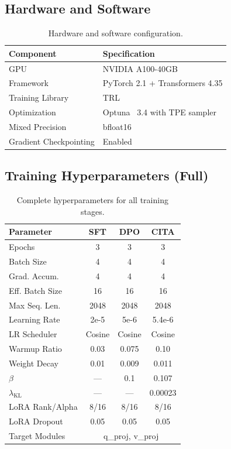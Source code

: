 \subsection{Hardware and Software}

\begin{table}[H]
\centering
\small
\begin{tabular}{@{}ll@{}}
\toprule
\textbf{Component} & \textbf{Specification} \\
\midrule
GPU & NVIDIA A100-40GB \\
Framework & PyTorch 2.1 + Transformers 4.35 \\
Training Library & TRL~\cite{tunstall2023zephyr} \\
Optimization & Optuna~\cite{akiba2019optuna} 3.4 with TPE sampler \\
Mixed Precision & bfloat16 \\
Gradient Checkpointing & Enabled \\
\bottomrule
\end{tabular}
\caption{Hardware and software configuration.}
\label{tab:hardware}
\end{table}

\subsection{Training Hyperparameters (Full)}

\begin{table}[H]
\centering
\footnotesize
\setlength{\tabcolsep}{3pt}
\begin{tabular}{@{}lccc@{}}
\toprule
\textbf{Parameter} & \textbf{SFT} & \textbf{DPO} & \textbf{CITA} \\
\midrule
Epochs & 3 & 3 & 3 \\
Batch Size & 4 & 4 & 4 \\
Grad. Accum. & 4 & 4 & 4 \\
Eff. Batch Size & 16 & 16 & 16 \\
Max Seq. Len. & 2048 & 2048 & 2048 \\
Learning Rate & 2e-5 & 5e-6 & 5.4e-6 \\
LR Scheduler & Cosine & Cosine & Cosine \\
Warmup Ratio & 0.03 & 0.075 & 0.10 \\
Weight Decay & 0.01 & 0.009 & 0.011 \\
$\beta$ & --- & 0.1 & 0.107 \\
$\lambda_{\text{KL}}$ & --- & --- & 0.00023 \\
LoRA Rank/Alpha & 8/16 & 8/16 & 8/16 \\
LoRA Dropout & 0.05 & 0.05 & 0.05 \\
Target Modules & \multicolumn{3}{c}{q\_proj, v\_proj} \\
\bottomrule
\end{tabular}
\caption{Complete hyperparameters for all training stages.}
\label{tab:full_hyperparams}
\end{table}

